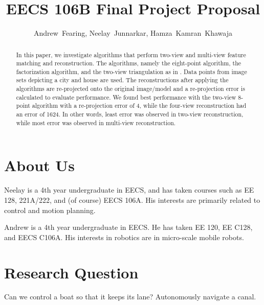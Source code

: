 \documentclass[conference]{IEEEtran}
\begin{document}
\title{EECS 106B Final Project Proposal}
\author{Andrew~Fearing, Neelay~Junnarkar,  Hamza~Kamran~Khawaja}
\maketitle


\begin{abstract} In this paper, we investigate algorithms that perform two-view and multi-view feature matching and reconstruction. The algorithms, namely the eight-point algorithm, the factorization algorithm, and the two-view triangulation as in \cite{ma2012invitation}. Data points from image sets depicting a city and house are used. The reconstructions after applying the algorithms are re-projected onto the original image/model and a re-projection error is calculated to evaluate performance. We found best performance with the two-view 8-point algorithm with a re-projection error of 4, while the four-view reconstruction had an error of 1624. In other words, least error was observed in two-view reconstruction, while most error was observed in multi-view reconstruction.
\end{abstract}


\section{About Us}
Neelay is a 4th year undergraduate in EECS, and has taken courses such as EE 128, 221A/222, and (of course) EECS 106A. His interests are primarily related to control and motion planning.

Andrew is a 4th year undergraduate in EECS. He has taken EE 120, EE C128, and EECS C106A. His interests in robotics are in micro-scale mobile robots.
\section{Research Question}
Can we control a boat so that it keeps its lane? Autonomously navigate a canal.
\end{document}
